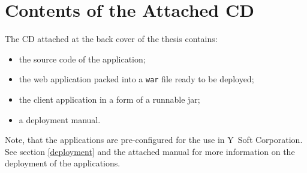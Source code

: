\documentclass[11pt,singleside]{myfithesis2}
\begin{document}
\chapter{Contents of the Attached CD}
The CD attached at the back cover of the thesis contains:
\begin{itemize}
	\item the source code of the application;
	\item the web application packed into a \texttt{war} file ready to be deployed;
	\item the client application in a form of a runnable jar;
	\item a deployment manual.
\end{itemize}
Note, that the applications are pre-configured for the use in Y~Soft Corporation. See section \ref{deployment} and the attached manual for more information on the deployment of the applications.
\end{document}
